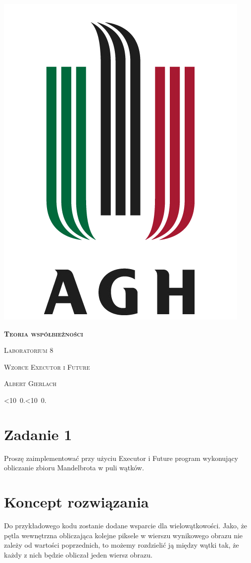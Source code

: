 \documentclass[12pt]{article}
\def\mydate{\leavevmode\hbox{\twodigits\day.\twodigits\month.\the\year}}
\def\twodigits#1{\ifnum#1<10 0\fi\the#1}
\begin{document}
\thispagestyle{empty}
\begin{center}
\begin{minipage}{0.75\linewidth}
    \centering
    \includegraphics[width=0.45\linewidth]{agh_logo2.png}
    \par
    \vspace{2cm}
    {\bfseries{\scshape{\Huge  Teoria współbieżności}}}
    \par
    \vspace{1.7cm}
    {\scshape{\Large Laboratorium 8}}
    \par
    \vspace{0.8cm}
    {\scshape{\Large Wzorce Executor i Future}}
    \par
    \vspace{3cm}

    {\scshape{\Large Albert Gierlach}}\par
    \vspace{1cm}

    {\Large \mydate}
\end{minipage}
\end{center}
\clearpage



\section{Zadanie 1}
Proszę zaimplementować przy użyciu Executor i Future program wykonujący obliczanie zbioru Mandelbrota w puli wątków.
  
\section{Koncept rozwiązania}
Do przykładowego kodu zostanie dodane wsparcie dla wielowątkowości. Jako, że pętla wewnętrzna obliczająca kolejne piksele w wierszu wynikowego obrazu nie zależy od wartości poprzednich, to możemy rozdzielić ją między wątki tak, że każdy z nich będzie obliczał jeden wiersz obrazu.
\end{document}
